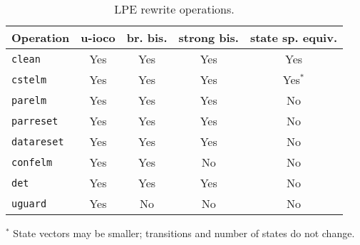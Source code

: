 \begin{table}[!ht]
\begin{center}
\begin{tabularx}{\linewidth}{X|c|c|c|c|}
\textbf{Operation} & \textbf{u-ioco} & \textbf{br. bis.} & \textbf{strong bis.} & \textbf{state sp. equiv.} \\ \hline
\texttt{clean} & Yes & Yes & Yes & Yes \\ \hline
\texttt{cstelm} & Yes & Yes & Yes & Yes$^{*}$ \\ \hline
\texttt{parelm} & Yes & Yes & Yes & No \\ \hline
\texttt{parreset} & Yes & Yes & Yes & No \\ \hline
\texttt{datareset} & Yes & Yes & Yes & No \\ \hline
\texttt{confelm} & Yes & Yes & No & No \\ \hline
\texttt{det} & Yes & Yes & Yes & No \\ \hline
\texttt{uguard} & Yes & No & No & No \\ \hline
\end{tabularx}
\caption{LPE rewrite operations.}
\begin{small}
$^{*}$ State vectors may be smaller; transitions and number of states do not change.
\end{small}
\label{lperewriteopsprops:table}
\end{center}
\end{table}



